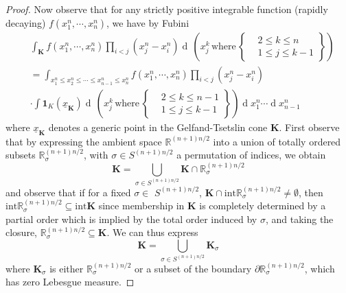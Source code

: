 \documentclass[11pt, reqno]{amsart}
\numberwithin{equation}{section}
\newcommand{\R}{\ensuremath{\mathbb{R}}}
\newcommand{\diff}{\ensuremath{\operatorname{d}\!}}
\begin{document}
\begin{proof}
    Now observe that for any strictly positive integrable function (rapidly decaying) $f(x^n_1, \cdots, x^n_n)$, we have by Fubini
\begin{equation*}\label{eq: int cone}
\begin{array}{cc}
     & \displaystyle\int_{\boldsymbol{K}}f (x^n_1, \cdots, x^n_n)\displaystyle\prod_{i<j} (x^n_j-x^n_i) \diff\, \left(x^k_j\, \mathrm{where}\, \left.\begin{cases}
       &2\le k \le n\\
       &1\le j \le k-1
   \end{cases}\right\} \right) \\
     & = \displaystyle\int_{x^n_1\le x^n_2\le \cdots\le x^n_{n-1}\le x^n_n}f (x^n_1, \cdots, x^n_n)\displaystyle\prod_{i<j} (x^n_j-x^n_i) \\
     & \cdot\displaystyle\int \mathbf{1}_K(\underline{x}_{\boldsymbol{K}})\diff\, \left(x^k_j\, \mathrm{where}\, \left.\begin{cases}
       &2\le k \le n-1\\
       &1\le j \le k-1
   \end{cases}\right\} \right)\diff x^n_1\cdots \diff x^n_{n-1}
\end{array}
\end{equation*}
where $\underline{x}_{\boldsymbol{K}}$ denotes a generic point in the Gelfand-Tsetslin cone $\boldsymbol{K}$. First observe that by expressing the ambient space $\R^{(n+1)n/2}$ into a union of totally ordered subsets $\R^{(n+1)n/2}_{\sigma}$, with $\sigma\in S^{(n+1)n/2}$ a permutation of indices, we obtain
\[
\boldsymbol{K} = \displaystyle\bigcup_{\sigma\in S^{(n+1)n/2}}\boldsymbol{K}\cap \R^{(n+1)n/2}_{\sigma}
\]
and observe that if for a fixed $\sigma\in $ $S^{(n+1)n/2}$, $\boldsymbol{K}\cap \mathrm{int}\R^{(n+1)n/2}_{\sigma}\neq \emptyset$, then $\mathrm{int}\R^{(n+1)n/2}_{\sigma}\subseteq\mathrm{int}\boldsymbol{K}$ since membership in $\boldsymbol{K}$ is completely determined by a partial order which is implied by the total order induced by $\sigma$, and taking the closure, $\R^{(n+1)n/2}_{\sigma}\subseteq\boldsymbol{K}$. We can thus express
\[
\boldsymbol{K} = \displaystyle\bigcup_{\sigma\in S^{(n+1)n/2}}\boldsymbol{K}_{\sigma}
\]
where $\boldsymbol{K}_{\sigma}$ is either $\R^{(n+1)n/2}_{\sigma}$ or a subset of the boundary $\partial\R^{(n+1)n/2}_{\sigma}$, which has zero Lebesgue measure.


\end{proof}
\end{document}
